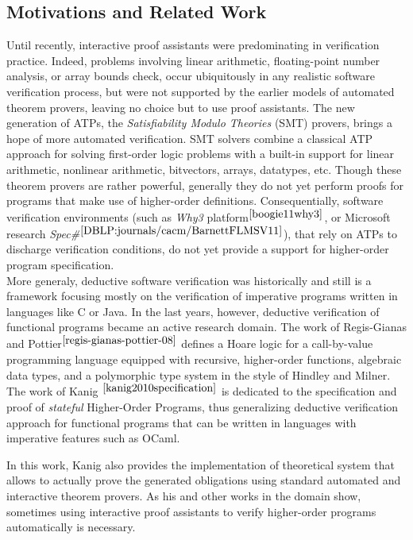 \documentclass[a4paper,11pt,oneside]{article}
\theoremstyle{plain}
\begin{document}
\subsection{Motivations and Related Work}

	Until recently, interactive proof assistants were predominating
in verification practice.
	Indeed, problems involving linear arithmetic, floating-point number analysis,
or array bounds check, occur ubiquitously in any realistic software
 verification process, but were not supported by the earlier models of automated theorem provers, leaving no choice but to use proof assistants.
	The new generation of ATPs, the \textit{Satisfiability Modulo Theories} (SMT) provers, brings a hope of more automated verification.
	SMT solvers combine a classical ATP approach for solving first-order logic problems with a built-in support for linear arithmetic, nonlinear arithmetic, bitvectors, arrays, datatypes, etc.
	Though these theorem provers are rather powerful, generally they do not yet perform proofs for programs that make use of higher-order definitions. 
	Consequentially, software verification environments (such as \textit{Why3} platform$^{\cite{boogie11why3}}$, or Microsoft research \textit{Spec\#}$^{\cite{DBLP:journals/cacm/BarnettFLMSV11}}$), that rely on ATPs to discharge verification conditions, do not yet provide a support for higher-order program specification. \\
	
	More generaly, deductive software verification was historically and still is a framework focusing mostly on the verification of imperative programs written in languages like C or Java. 
	In the last years, however, deductive verification of functional programs became an
active research domain.  The work of Regis-Gianas and
Pottier$^{\cite{regis-gianas-pottier-08}}$ defines a Hoare logic for a
call-by-value programming language equipped with recursive,
higher-order functions, algebraic data types, and a polymorphic type
system in the style of Hindley and Milner.  The work of
Kanig$^{~\cite{kanig2010specification}}$ is dedicated to the
specification and proof of \textit{stateful} Higher-Order Programs,
thus generalizing deductive verification approach for functional
programs that can be written in languages with imperative features
such as OCaml.

 In this work, Kanig also provides the implementation of theoretical system that allows to actually prove the generated obligations using standard automated and interactive theorem provers. 
 As his and other works in the domain show, sometimes using interactive proof assistants to verify higher-order programs automatically is necessary. 
  
\end{document}
